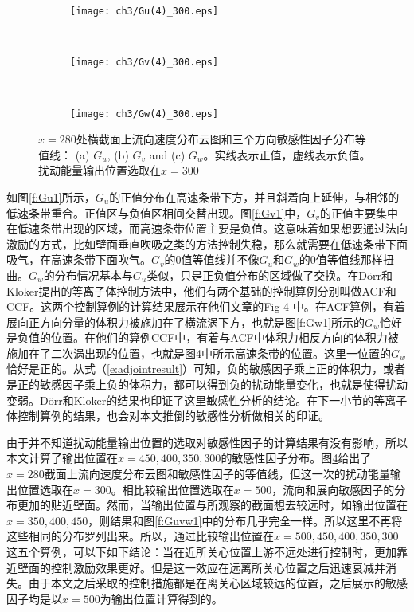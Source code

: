 \begin{figure}[H]
  \centering
  \begin{subfigure}{0.8\textwidth}
  \texttt{[image: ch3/Gu(4)\_300.eps]}
  \caption{\label{f:Gu1_300}}
  \end{subfigure}\\
  \bigskip
  \begin{subfigure}{0.8\textwidth}
  \texttt{[image: ch3/Gv(4)\_300.eps]}
  \caption{\label{f:Gv1_300}}
  \end{subfigure}\\
  \bigskip
  \begin{subfigure}{0.8\textwidth}
  \texttt{[image: ch3/Gw(4)\_300.eps]}
  \caption{\label{f:Gw1_300}}
  \end{subfigure}
  \caption{$x =280$处横截面上流向速度分布云图和三个方向敏感性因子分布等值线： (a) $G_u$, (b) $G_v$ and (c) $G_w$。实线表示正值，虚线表示负值。扰动能量输出位置选取在$x =300$}\label{f:Guvw1_300}
\end{figure}

如图\ref{f:Gu1}所示，$G_u$的正值分布在高速条带下方，并且斜着向上延伸，与相邻的低速条带重合。正值区与负值区相间交替出现。图\ref{f:Gv1}中，$G_v$的正值主要集中在低速条带出现的区域，而高速条带位置主要是负值。这意味着如果想要通过法向激励的方式，比如壁面垂直吹吸之类的方法控制失稳，那么就需要在低速条带下面吸气，在高速条带下面吹气。$G_v$的0值等值线并不像$G_u$和$G_w$的0值等值线那样扭曲。$G_w$的分布情况基本与$G_u$类似，只是正负值分布的区域做了交换。在D\"orr和Kloker\cite{dorr2016}提出的等离子体控制方法中，他们有两个基础的控制算例分别叫做ACF和CCF。这两个控制算例的计算结果展示在他们文章的Fig 4 中。在ACF算例，有着展向正方向分量的体积力被施加在了横流涡下方，也就是图\ref{f:Gw1}所示的$G_w$恰好是负值的位置。在他们的算例CCF中，有着与ACF中体积力相反方向的体积力被施加在了二次涡出现的位置，也就是图\ref{f:Guvw1_300}中所示高速条带的位置。这里一位置的$G_w$恰好是正的。从式（\ref{e:adjointresult}）可知，负的敏感因子乘上正的体积力，或者是正的敏感因子乘上负的体积力，都可以得到负的扰动能量变化，也就是使得扰动变弱。D\"orr和Kloker\cite{dorr2016}的结果也印证了这里敏感性分析的结论。在下一小节的等离子体控制算例的结果，也会对本文推倒的敏感性分析做相关的印证。

由于并不知道扰动能量输出位置的选取对敏感性因子的计算结果有没有影响，所以本文计算了输出位置在$x=450,400,350,300$的敏感性因子分布。图\ref{f:Guvw1_300}给出了$x=280$截面上流向速度分布云图和敏感性因子的等值线，但这一次的扰动能量输出位置选取在$x=300$。相比较输出位置选取在$x=500$，流向和展向敏感因子的分布更加的贴近壁面。然而，当输出位置与所观察的截面想去较远时，如输出位置在$x=350,400,450$，则结果和图\ref{f:Guvw1}中的分布几乎完全一样。所以这里不再将这些相同的分布罗列出来。所以，通过比较输出位置在$x=500,450,400,350,300$这五个算例，可以下如下结论：当在近所关心位置上游不远处进行控制时，更加靠近壁面的控制激励效果更好。但是这一效应在远离所关心位置之后迅速衰减并消失。由于本文之后采取的控制措施都是在离关心区域较远的位置，之后展示的敏感因子均是以$x=500$为输出位置计算得到的。

